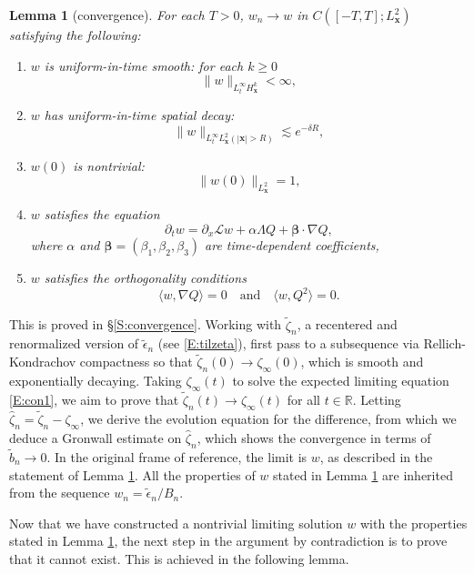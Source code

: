 \documentclass[12pt,letterpaper]{amsart}
\newcommand{\la}{\langle}
\newcommand{\ra}{\rangle}
\newtheorem{lemma}[theorem]{Lemma}
\theoremstyle{remark}
\numberwithin{equation}{section}
\numberwithin{theorem}{section}
\numberwithin{table}{section}
\begin{document}
\begin{lemma}[convergence]
\label{L:convergence}
For each $T>0$, $w_n \to w$ in $C([-T,T]; L_{\mathbf{x}}^2)$ satisfying the following:
\begin{enumerate}
\item 
$w$ is uniform-in-time smooth:  for each $k\geq 0$
$$
\| w\|_{L_t^\infty H_{\mathbf{x}}^k} < \infty,
$$
\item 
$w$ has uniform-in-time spatial decay:  
$$
\|  w \|_{L_t^\infty L_{\mathbf{x}}^2(|\mathbf{x}|>R)} \lesssim e^{-\delta R},
$$
\item 
$w(0)$ is nontrivial:
$$
\| w(0) \|_{L_{\mathbf{x}}^2} = 1,
$$
\item 
$w$ satisfies the equation
$$
\partial_t w = \partial_x \mathcal{L}w + \alpha \Lambda Q + \boldsymbol{\beta} \cdot \nabla Q,
$$
where $\alpha$ and $\boldsymbol{\beta} = (\beta_1,\beta_2,\beta_3)$ are time-dependent coefficients,
\item 
$w$ satisfies the orthogonality conditions
$$
\la w, \nabla Q \ra =0 \quad \text{and} \quad \la w, Q^2 \ra =0.
$$
\end{enumerate} 
\end{lemma}

This is proved in \S \ref{S:convergence}.  Working with $\tilde \zeta_n$, a recentered and renormalized version of $\tilde \epsilon_n$ (see \eqref{E:tilzeta}), first pass to a subsequence via Rellich-Kondrachov compactness so that $\tilde \zeta_n(0) \to \zeta_\infty(0)$, which is smooth and exponentially decaying.  Taking $\zeta_\infty(t)$ to solve the expected limiting equation \eqref{E:con1}, we aim to prove that $\tilde \zeta_n(t) \to \zeta_\infty(t)$ for all $t\in \mathbb{R}$.    Letting $\hat \zeta_n= \tilde \zeta_n - \zeta_\infty$, we derive the evolution equation for the difference, from which we deduce a Gronwall estimate on $\hat \zeta_n$, which shows the convergence in terms of $\tilde b_n \to 0$.  In the original frame of reference, the limit is $w$, as described in the statement of Lemma \ref{L:convergence}.  All the properties of $w$ stated in Lemma \ref{L:convergence} are inherited from the sequence $w_n =\tilde \epsilon_n/B_n$.  

Now that we have constructed a nontrivial limiting solution $w$ with the properties stated in Lemma \ref{L:convergence}, the next step in the argument by contradiction is to prove that it cannot exist.  This is achieved in the following lemma.
\end{document}
